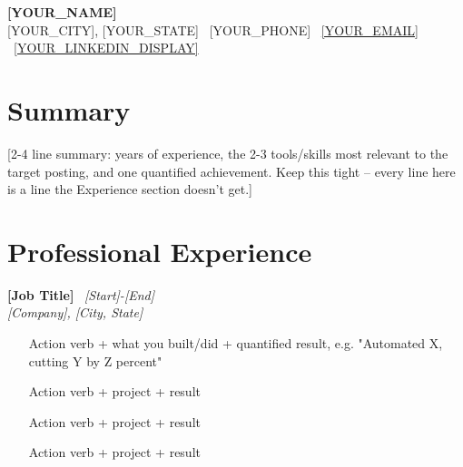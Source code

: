 \documentclass[10.5pt,letterpaper]{article}
\newcommand{\cvheader}[3]{%
  \noindent\textbf{#1} \textbar\ \textit{#3}\\
  \textit{#2}
}
\begin{document}
\begin{center}
  {\Large\bfseries [YOUR_NAME]}\\[1pt]
  [YOUR_CITY], [YOUR_STATE] \textbar\ [YOUR_PHONE] \textbar\ \href{mailto:[YOUR_EMAIL]}{[YOUR_EMAIL]} \textbar\ \href{[YOUR_LINKEDIN_URL]}{[YOUR_LINKEDIN_DISPLAY]}
\end{center}
\vspace{4pt}


\section{Summary}
[2-4 line summary: years of experience, the 2-3 tools/skills most relevant to the target posting, and one quantified achievement. Keep this tight -- every line here is a line the Experience section doesn't get.]

\section{Professional Experience}

\cvheader{[Job Title]}{[Company], [City, State]}{[Start]-[End]}
\begin{itemize}
  \item [Action verb + what you built/did + quantified result, e.g. "Automated X, cutting Y by Z percent"]
  \item [Action verb + project + result]
  \item [Action verb + project + result]
  \item [Action verb + project + result]
\end{itemize}
\end{document}
